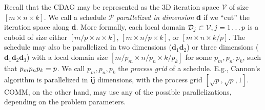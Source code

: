 \documentclass[sigplan,review,anonymous,10pt]{acmart}\settopmatter{printfolios=true,printccs=false,printacmref=false}
\newcommand\greg[1]{\textcolor{blue}{[Greg: #1]}}
\newcommand\mac[1]{\textcolor{red}{[Mac: #1]}}
\begin{document}

Recall that the CDAG may be represented as the 3D iteration space
$\mathcal{V}$ of size $[m \times n \times k]$. We call a schedule $\mathcal{P}$
\emph{parallelized in dimension} \textbf{d} if we ``cut'' the iteration space 
along \textbf{d}. More formally, each local domain $\mathcal{D}_j
\subset \mathcal{V}, j =\nobreak 1 \dots p$ is a cuboid of size either $[m/p 
\times
n \times k]$,  $[m \times
n/p \times k]$, or  $[m \times
n \times k/p]$. 
The schedule may also be parallelized in two dimensions
($\mathbf{d}_1\mathbf{d}_2$) or three dimensions
($\mathbf{d}_1\mathbf{d}_2\mathbf{d}_3$) with a local domain size $[m / p_m 
\times
n / p_n \times k / p_k]$  for some $p_m, p_n, p_k$, such that
$p_m p_n p_k = \nobreak p$. We call $p_m, p_n, p_k$ the
\emph{process grid} of a schedule. E.g., Cannon's algorithm is parallelized in 
\textbf{ij} dimensions, with the process grid $[\sqrt{p}, \sqrt{p}, 1]$. COMM, 
on the other hand, may use any of the possible parallelizations, depending on 
the problem parameters.
%



\end{document}
